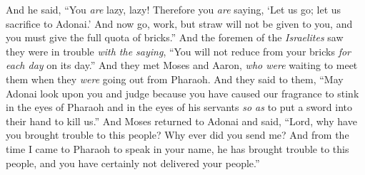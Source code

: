 \begin{biblechapter}
\verse And he said, “You \textit{are} lazy, lazy! Therefore you \textit{are} saying, ‘Let us go; let us sacrifice to Adonai.’
\verse And now go, work, but straw will not be given to you, and you must give the full quota of bricks.”
\verse And the foremen of the \textit{Israelites} saw they were in trouble \textit{with the saying}, “You will not reduce from your bricks \textit{for each day} on its day.”
\verse And they met Moses and Aaron, \textit{who were} waiting to meet them when they \textit{were} going out from Pharaoh.
\verse And they said to them, “May Adonai look upon you and judge because you have caused our fragrance to stink in the eyes of Pharaoh and in the eyes of his servants \textit{so as} to put a sword into their hand to kill us.”
\verse And Moses returned to Adonai and said, “Lord, why have you brought trouble to this people? Why ever did you send me?
\verse And from the time I came to Pharaoh to speak in your name, he has brought trouble to this people, and you have certainly not delivered your people.”
\end{biblechapter}

